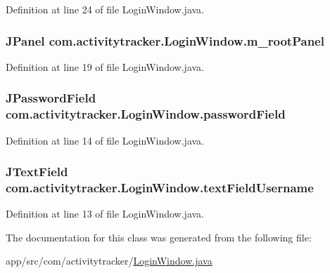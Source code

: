 Definition at line 24 of file Login\+Window.\+java.

\subsubsection[{\texorpdfstring{m\+\_\+root\+Panel}{m_rootPanel}}]{\setlength{\rightskip}{0pt plus 5cm}J\+Panel com.\+activitytracker.\+Login\+Window.\+m\+\_\+root\+Panel\hspace{0.3cm}{\ttfamily [private]}}\hypertarget{classcom_1_1activitytracker_1_1_login_window_aa62049382baddb801cb25201814efc57}{}\label{classcom_1_1activitytracker_1_1_login_window_aa62049382baddb801cb25201814efc57}


Definition at line 19 of file Login\+Window.\+java.

\subsubsection[{\texorpdfstring{password\+Field}{passwordField}}]{\setlength{\rightskip}{0pt plus 5cm}J\+Password\+Field com.\+activitytracker.\+Login\+Window.\+password\+Field\hspace{0.3cm}{\ttfamily [private]}}\hypertarget{classcom_1_1activitytracker_1_1_login_window_ae53353ceea197fe7b93f1b7156112d08}{}\label{classcom_1_1activitytracker_1_1_login_window_ae53353ceea197fe7b93f1b7156112d08}


Definition at line 14 of file Login\+Window.\+java.

\subsubsection[{\texorpdfstring{text\+Field\+Username}{textFieldUsername}}]{\setlength{\rightskip}{0pt plus 5cm}J\+Text\+Field com.\+activitytracker.\+Login\+Window.\+text\+Field\+Username\hspace{0.3cm}{\ttfamily [private]}}\hypertarget{classcom_1_1activitytracker_1_1_login_window_aba181dcec114c349a67304406bcce92a}{}\label{classcom_1_1activitytracker_1_1_login_window_aba181dcec114c349a67304406bcce92a}


Definition at line 13 of file Login\+Window.\+java.



The documentation for this class was generated from the following file\+:\begin{DoxyCompactItemize}
\item 
app/src/com/activitytracker/\hyperlink{_login_window_8java}{Login\+Window.\+java}\end{DoxyCompactItemize}
